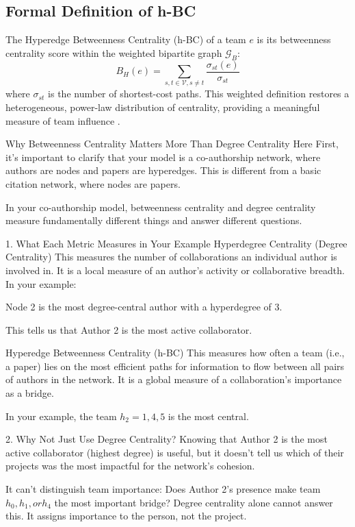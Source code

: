 \documentclass[11pt, a4paper]{article}
\begin{document}
{\subsection{Formal Definition of h-BC}
The Hyperedge Betweenness Centrality (h-BC) of a team $e$ is its betweenness centrality score within the weighted bipartite graph $\mathcal{G}_B$:
\begin{equation}
    B_H(e) = \sum_{s,t \in \mathcal{V}, s \neq t} \frac{\sigma_{st}(e)}{\sigma_{st}}
\end{equation}
where $\sigma_{st}$ is the number of shortest-cost paths. This weighted definition restores a heterogeneous, power-law distribution of centrality, providing a meaningful measure of team influence .

Why Betweenness Centrality Matters More Than Degree Centrality Here
First, it's important to clarify that your model is a co-authorship network, where authors are nodes and papers are hyperedges. This is different from a basic citation network, where nodes are papers.

In your co-authorship model, betweenness centrality and degree centrality measure fundamentally different things and answer different questions.

1. What Each Metric Measures in Your Example
Hyperdegree Centrality (Degree Centrality)
This measures the number of collaborations an individual author is involved in. It is a local measure of an author's activity or collaborative breadth. In your example:

Node 2 is the most degree-central author with a hyperdegree of 3.

This tells us that Author 2 is the most active collaborator.

Hyperedge Betweenness Centrality (h-BC)
This measures how often a team (i.e., a paper) lies on the most efficient paths for information to flow between all pairs of authors in the network. It is a global measure of a collaboration's importance as a bridge.

In your example, the team $h_2=1,4,5$ is the most central.

2. Why Not Just Use Degree Centrality?
Knowing that Author 2 is the most active collaborator (highest degree) is useful, but it doesn't tell us which of their projects was the most impactful for the network's cohesion.

It can't distinguish team importance: Does Author 2's presence make team $h_0, h_1, or h_4$ the most important bridge? Degree centrality alone cannot answer this. It assigns importance to the person, not the project.

}
\end{document}
